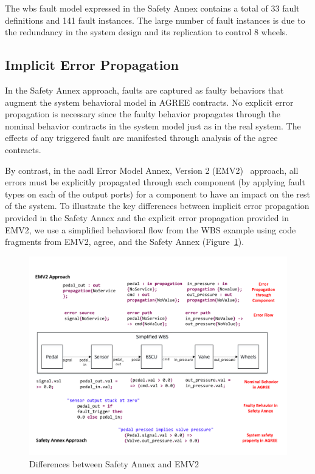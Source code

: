 The \gls{wbs} fault model expressed in the Safety Annex contains a total of 33 fault definitions and 141 fault instances. The large number of fault instances is due to the redundancy in the system design and its replication to control 8 wheels.

\subsection{Implicit Error Propagation}
\label{subsec:implicit}
In the Safety Annex approach, faults are captured as faulty behaviors that augment the system behavioral model in AGREE contracts. No explicit error propagation is necessary since the faulty behavior propagates through the nominal behavior contracts in the system model just as in the real system. The effects of any triggered fault are manifested through analysis of the \gls{agree} contracts. 

By contrast, in the \gls{aadl} Error Model Annex, Version 2 (EMV2)~\cite{EMV2} approach, all errors must be explicitly propagated through each component (by applying fault types on each of the output ports) for a component to have an impact on the rest of the system. To illustrate the key differences between implicit error propagation provided in the Safety Annex and the explicit error propagation provided in EMV2, we use a simplified behavioral flow from the WBS example using code fragments from EMV2, \gls{agree}, and the Safety Annex (Figure~\ref{fig:comparison_with_EMV2}). 

\begin{figure}[t]
	\vspace{-0.19in}
	\centering
	\includegraphics[trim=0 9 0 5,clip,width=\textwidth]{images/Comparison_with_EMV2.pdf}
	\caption{Differences between Safety Annex and EMV2}
	\label{fig:comparison_with_EMV2}
\end{figure} 

